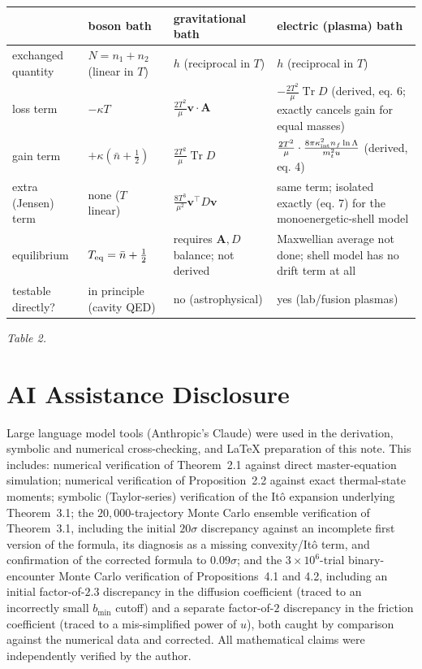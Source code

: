 \documentclass[12pt]{amsart}
\theoremstyle{plain}
\theoremstyle{remark}
\begin{document}
\begin{center}
\small
\begin{tabular}{@{}lp{3.1cm}p{3.6cm}p{3.6cm}@{}}
\hline
& boson bath & gravitational bath & electric (plasma) bath \\
\hline
exchanged quantity & $N=n_1+n_2$ (linear in $T$) & $h$ (reciprocal in $T$) & $h$ (reciprocal in $T$) \\
loss term & $-\kappa T$ & $\frac{2T^2}{\mu}\mathbf v\cdot\mathbf A$ & $-\frac{2T^2}{\mu}\operatorname{Tr}D$ (derived, eq. 6; exactly cancels gain for equal masses) \\
gain term & $+\kappa(\bar n+\tfrac12)$ & $\frac{2T^2}{\mu}\operatorname{Tr}D$ & $\frac{2T^2}{\mu}\cdot\frac{8\pi\kappa_{\rm int}^2n_f\ln\Lambda}{m_t^2u}$ (derived, eq. 4) \\
extra (Jensen) term & none ($T$ linear) & $\frac{8T^3}{\mu^2}\mathbf v^\top D\mathbf v$ & same term; isolated exactly (eq. 7) for the monoenergetic-shell model \\
equilibrium & $T_{\rm eq}=\bar n+\tfrac12$ & requires $\mathbf A,D$ balance; not derived & Maxwellian average not done; shell model has no drift term at all \\
testable directly? & in principle (cavity QED) & no (astrophysical) & yes (lab/fusion plasmas) \\
\hline
\end{tabular}
\end{center}
\emph{Table 2.}

\section*{AI Assistance Disclosure}

Large language model tools (Anthropic's Claude) were used in the derivation, symbolic and numerical cross-checking, and \LaTeX{} preparation of this note. This includes: numerical verification of Theorem~2.1 against direct master-equation simulation; numerical verification of Proposition~2.2 against exact thermal-state moments; symbolic (Taylor-series) verification of the It\^o expansion underlying Theorem~3.1; the $20{,}000$-trajectory Monte Carlo ensemble verification of Theorem~3.1, including the initial $20\sigma$ discrepancy against an incomplete first version of the formula, its diagnosis as a missing convexity/It\^o term, and confirmation of the corrected formula to $0.09\sigma$; and the $3\times10^6$-trial binary-encounter Monte Carlo verification of Propositions~4.1 and 4.2, including an initial factor-of-$2.3$ discrepancy in the diffusion coefficient (traced to an incorrectly small $b_{\min}$ cutoff) and a separate factor-of-$2$ discrepancy in the friction coefficient (traced to a mis-simplified power of $u$), both caught by comparison against the numerical data and corrected. All mathematical claims were independently verified by the author.
\end{document}
